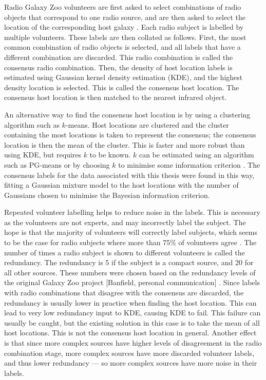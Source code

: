     Radio Galaxy Zoo volunteers are first asked to select combinations of radio
    objects that correspond to one radio source, and are then asked to select
    the location of the corresponding host galaxy \cite{banfield15}. Each radio
    subject is labelled by multiple volunteers. These labels are then collated
    as follows. First, the most common combination of radio objects is
    selected, and all labels that have a different combination are discarded.
    This radio combination is called the consensus radio combination. Then, the
    density of host location labels is estimated using Gaussian kernel density
    estimation (KDE), and the highest density location is selected. This is
    called the consensus host location. The consensus host location is then
    matched to the nearest infrared object.

    An alternative way to find the consensus host location is by using a
    clustering algorithm such as $k$-means. Host locations are clustered and
    the cluster containing the most locations is taken to represent the
    consensus; the consensus location is then the mean of the cluster. This is
    faster and more robust than using KDE, but requires $k$ to be known. $k$
    can be estimated using an algorithm such as PG-means \cite{hamerly07} or by
    choosing $k$ to minimise some information criterion .
    The consensus labels for the data associated with this thesis were found in
    this way, fitting a Gaussian mixture model to the host locations with the
    number of Gaussians chosen to minimise the Bayesian information criterion.

    Repeated volunteer labelling helps to reduce noise in the labels. This is
    necessary as the volunteers are not experts, and may incorrectly label the
    subject. The hope is that the majority of volunteers will correctly label
    subjects, which seems to be the case for radio subjects where more than
    75\% of volunteers agree \cite{banfield15}. The number of times a radio
    subject is shown to different volunteers is called the redundancy. The
    redundancy is 5 if the subject is a compact source, and 20 for all other
    sources. These numbers were chosen based on the redundancy levels of the
    original Galaxy Zoo project [Banfield, personal communication] . Since labels with radio combinations that disagree with
    the consensus are discarded, the redundancy is usually lower in practice
    when finding the host location. This can lead to very low redundancy input
    to KDE, causing KDE to fail. This failure can usually be caught, but the
    existing solution in this case is to take the mean of all host locations.
    This is not the consensus host location in general. Another effect is that
    since more complex sources have higher levels of disagreement in the radio
    combination stage, more complex sources have more discarded volunteer
    labels, and thus lower redundancy --- so more complex sources have more
    noise in their labels.

